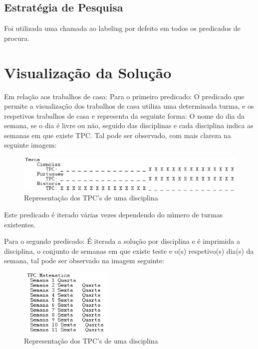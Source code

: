 \documentclass{llncs}
\begin{document}
\subsection{Estratégia de Pesquisa}

Foi utilizada uma chamada ao labeling por defeito em todos os predicados de procura.


\section{Visualização da Solução}
Em relação aos trabalhos de casa:
Para o primeiro predicado:
O predicado que permite a visualização dos trabalhos de casa utiliza uma determinada turma, e os respetivos trabalhos de casa e representa da seguinte forma:
O nome do dia da semana, se o dia é livre ou não, seguido das disciplinas e cada disciplina indica as semanas em que existe TPC. Tal pode ser observado, com mais clareza na seguinte imagem:

\begin{figure}
\centering
\includegraphics[width=1\textwidth]{tpc1}
\caption{Representação dos TPC's de uma disciplina}
\end{figure}
\FloatBarrier

Este predicado é iterado várias vezes dependendo do número de turmas existentes.

Para o segundo predicado:
É iterada a solução por disciplina e é imprimida a disciplina, o conjunto de semanas em que existe teste e o(s) respetivo(s) dia(s) da semana, tal pode ser observado na imagem seguinte:
\begin{figure}
\centering
\includegraphics[width=0.4\textwidth]{tpc2}
\caption{Representação dos TPC's de uma disciplina}
\end{figure}
\FloatBarrier
\end{document}

